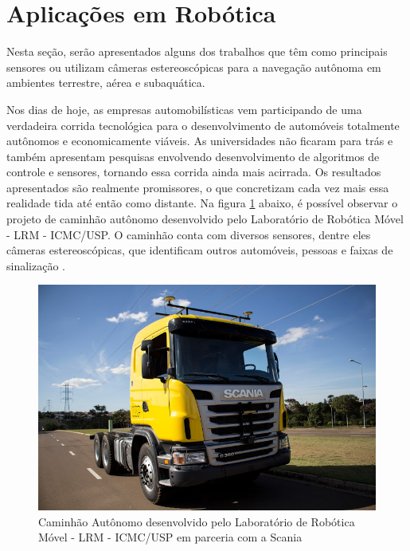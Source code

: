 \section{Aplicações em Robótica}

Nesta seção, serão apresentados alguns dos trabalhos que têm como principais sensores ou utilizam câmeras estereoscópicas para a navegação autônoma em ambientes terrestre, aérea e subaquática.

Nos dias de hoje, as empresas automobilísticas vem participando de uma verdadeira corrida tecnológica para o desenvolvimento de automóveis totalmente autônomos e economicamente viáveis. As universidades não ficaram para trás e também apresentam pesquisas envolvendo desenvolvimento de algoritmos de controle e sensores, tornando essa corrida ainda mais acirrada. Os resultados apresentados são realmente promissores, o que concretizam cada vez mais essa realidade tida até então como distante. Na figura \ref{caminhao_autonomo} abaixo, é possível observar o projeto de caminhão autônomo desenvolvido pelo Laboratório de Robótica Móvel - LRM - ICMC/USP. O caminhão conta com diversos sensores, dentre eles câmeras estereoscópicas, que identificam outros automóveis, pessoas e faixas de sinalização \cite{ShinzatoP}. 

\begin{figure}[H]
 	\centering
 	\includegraphics[scale=0.35]{./Resources/caminhao_autonomo.jpg}
 	\caption{Caminhão Autônomo desenvolvido pelo Laboratório de Robótica Móvel - LRM - ICMC/USP em parceria com a Scania}
 	\label{caminhao_autonomo}
\end{figure}

